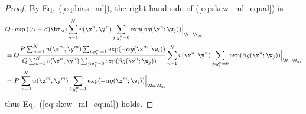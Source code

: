 \begin{proof}
By Eq.~(\ref{eq:bias_ml}), the right hand side of (\ref{eq:skew_ml_equal}) is
\begin{equation*}
\begin{aligned}
&  Q \cdot \exp \left( (\alpha + \beta) \bt_\textsc{m} \right) \sum_{n=1}^N v(\x^n, \y^n) \sum_{j: y_j^n = 0} \exp( \beta  g(\x^n; \w_j)) \Big|_{\W = \W_\textsc{mr}} \\
&= Q  
   \frac{P \sum_{m=1}^N u(\x^m, \y^m) \sum_{i: y_i^m = 1} \exp(-\alpha g(\x^m; \w_i))}
        {Q \sum_{n=1}^N v(\x^n, \y^n) \sum_{j: y_j^n = 0} \exp( \beta  g(\x^n; \w_j)) \hspace{1em}} 
   \sum_{n=1}^N v(\x^n, \y^n) \sum_{j: y_j^n = 0} \exp( \beta  g(\x^n; \w_j)) \Big|_{\W = \W_\textsc{mr}} \\
&= P \sum_{m=1}^N u(\x^m, \y^m) \sum_{i: y_i^m = 1} \exp(-\alpha g(\x^m; \w_i)) \Big|_{\W = \W_\textsc{mr}}.
\end{aligned}
\end{equation*}
thus Eq.~(\ref{eq:skew_ml_equal}) holds.


\end{proof}
